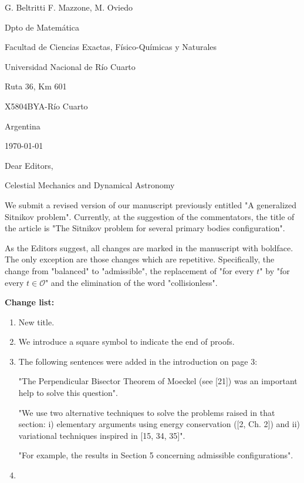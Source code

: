 \documentclass{article}
\begin{document}
\begin{flushright}
G. Beltritti
F. Mazzone,
M. Oviedo


Dpto de Matem\'atica

Facultad de Ciencias Exactas, F\'isico-Qu\'imicas y Naturales

Universidad Nacional de R\'io Cuarto

Ruta 36, Km 601

X5804BYA-R\'io Cuarto

Argentina
\end{flushright}

\today
\vspace{1cm}

Dear Editors,

Celestial Mechanics and Dynamical Astronomy

\vspace{.5cm}

We  submit a revised version of our manuscript previously entitled "A generalized Sitnikov problem". Currently, at the suggestion of the commentators, the title of the article is  "The Sitnikov problem for several primary bodies configuration".

As the Editors suggest, all changes are marked in the manuscript with boldface. The only exception are those changes which are repetitive. Specifically, the change from "balanced" to "admissible", the replacement of "for every $t$" by "for every $t \in \mathcal{O}$" and the elimination of the word "collisionless".

\textbf{Change list:}
\begin{enumerate}
 \item New title.
 \item We introduce a square symbol to indicate the end of proofs.
 \item The following sentences were added in the introduction on page 3:

"The Perpendicular Bisector Theorem of Moeckel (see [21]) was an important help to solve
this question".

"We use two alternative techniques to solve
the problems raised in that section: i) elementary arguments using energy
conservation ([2, Ch. 2]) and ii) variational techniques inspired in [15, 34, 35]".

"For example, the results in Section 5 concerning admissible configurations".
\item 

\end{enumerate}
\end{document}
